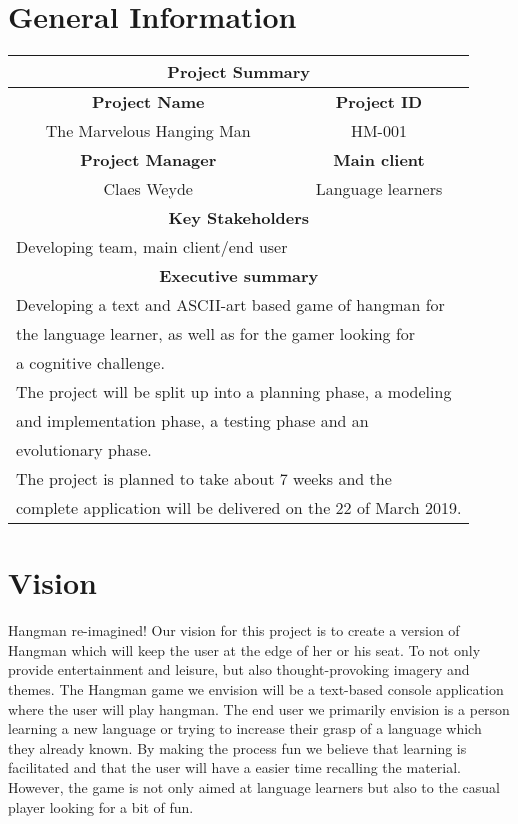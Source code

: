 \documentclass[12pt, letterpaper]{article}
\begin{document}
\section{General Information}
\begin{tabular}{ |c|c|  }
	\hline
	\multicolumn{2}{|c|}{\textbf{Project Summary}} \\
	\hline
	\textbf{Project Name} & \textbf{Project ID} \\
	\hline
	The Marvelous Hanging Man & HM-001 \\
	\hline
	\textbf{Project Manager} & \textbf{Main client} \\
	\hline
	Claes Weyde & Language learners   \\
	\hline
	\multicolumn{2}{|c|}{\textbf{Key Stakeholders}}\\
	\hline
	\multicolumn{2}{|l|}{Developing team, main client/end user}\\
	\hline
	\multicolumn{2}{|c|}{\textbf{Executive summary}}\\
	\hline
	\multicolumn{2}{|l|}{Developing a text and ASCII-art based game of hangman for}\\
	\multicolumn{2}{|l|}{the language learner, as well as for the gamer looking for}\\
	\multicolumn{2}{|l|}{a cognitive challenge.}\\
	\multicolumn{2}{|l|}{The project will be split up into a planning phase, a modeling}\\
	\multicolumn{2}{|l|}{ and implementation phase, a testing phase and an}\\
	\multicolumn{2}{|l|}{ evolutionary phase.}\\
	\multicolumn{2}{|l|}{The project is planned to take about 7 weeks and the  }\\
	\multicolumn{2}{|l|}{complete application will be delivered on the 22 of March 2019.}\\

	\hline
	
\end{tabular}
\newpage
\section{Vision}
Hangman re-imagined! Our vision for this project is to create a version of Hangman which will keep the user at the edge of her or his seat. To not only provide entertainment and leisure, but also thought-provoking imagery and themes. 
\newline
\newline
 The Hangman game we envision will be a text-based console application where the user will play hangman. The end user we primarily envision is a person learning a new language or trying to increase their grasp of a language which they already known. By making the process fun we believe that learning is facilitated and that the user will have a easier time recalling the material. However, the game is not only aimed at language learners but also to the casual player looking for a bit of fun.
 \newline
 
\end{document}

